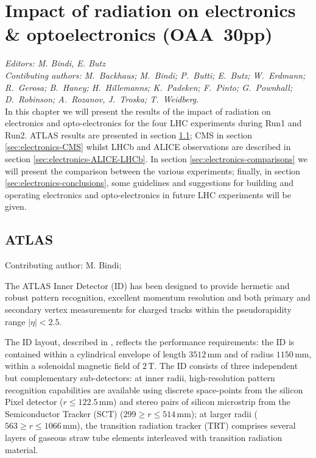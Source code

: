 \section{Impact of radiation on electronics \& optoelectronics (\textbf{OAA~30pp})}
\label{sec:electronics}

{\it Editors: M. Bindi, E. Butz}  \\
{\it Contibuting authors: M.~Backhaus; M.~Bindi; P.~Butti; E.~Butz; W.~Erdmann; R.~Gerosa; B.~Haney; H.~Hillemanns; K.~Padeken; F.~Pinto; G.~Pownhall; D.~Robinson; A.~Rozanov, J.~Troska; T.~Weidberg.}  \\

\noindent 
In this chapter we will present the results of the impact of radiation on electronics and opto-electronics for the four LHC experiments during Run1 and Run2. ATLAS results are presented in section \ref{sec:electronics-ATLAS}; CMS in section  \ref{sec:electronics-CMS} whilst LHCb and ALICE observations are described in section  \ref{sec:electronics-ALICE-LHCb}. In section \ref{sec:electronics-comparisons} we will present the comparison between the various experiments; finally, in section \ref{sec:electronics-conclusions}, some guidelines and suggestions  for building and operating electronics and opto-electronics in future LHC experiments will be given.

\subsection{ATLAS}
\label{sec:electronics-ATLAS}
Contributing author: M. Bindi;
\noindent 

The ATLAS Inner Detector (ID) has been designed to provide hermetic and robust pattern recognition, 
excellent momentum resolution and both primary and secondary vertex measurements for charged tracks within the pseudorapidity range \mbox{$|\eta|<2.5$}.

The ID layout, described in \cite{jinst3s08003}, reflects the performance requirements: the ID is contained within a cylindrical
envelope of length $3512\,{\text{mm}}$ and of radius $1150\,{\text{mm}}$, within a solenoidal magnetic field of
$2\,{\text{T}}$. The ID consists of three independent but complementary sub-detectors: at inner radii, high-resolution pattern
recognition capabilities are available using discrete space-points from the silicon Pixel detector (\mbox{$r\leq122.5\,{\text{mm}}$}) and
stereo pairs of silicon microstrip from the Semiconductor Tracker (SCT)
(\mbox{$299\geq r\leq514\,{\text{mm}}$}); at larger radii (\mbox{$563\geq r\leq1066\,{\text{mm}}$}), the transition radiation
tracker (TRT) comprises several layers of gaseous straw tube elements interleaved with transition radiation material. 
 
